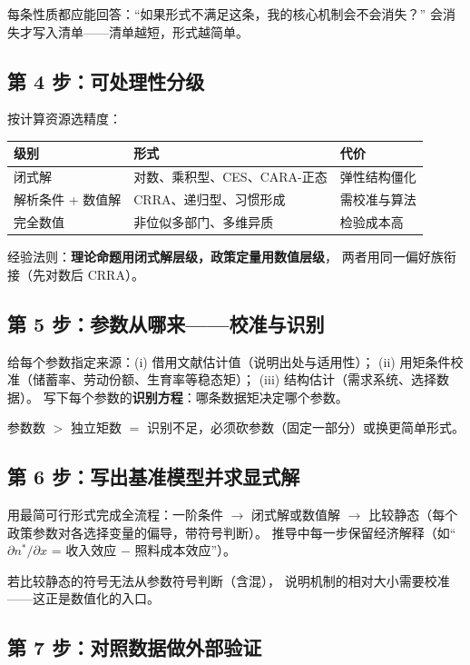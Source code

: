 每条性质都应能回答：“如果形式不满足这条，我的核心机制会不会消失？”
会消失才写入清单——清单越短，形式越简单。

\subsection{第 4 步：可处理性分级}

按计算资源选精度：
\begin{center}
\small
\setlength{\tabcolsep}{4pt}
\begin{tabular}{lll}
\toprule
级别 & 形式 & 代价 \\
\midrule
闭式解 & 对数、乘积型、CES、CARA-正态 & 弹性结构僵化 \\
解析条件 + 数值解 & CRRA、递归型、习惯形成 & 需校准与算法 \\
完全数值 & 非位似多部门、多维异质 & 检验成本高 \\
\bottomrule
\end{tabular}
\end{center}
经验法则：\textbf{理论命题用闭式解层级，政策定量用数值层级}，
两者用同一偏好族衔接（先对数后 CRRA）。

\subsection{第 5 步：参数从哪来——校准与识别}

给每个参数指定来源：(i) 借用文献估计值（说明出处与适用性）；
(ii) 用矩条件校准（储蓄率、劳动份额、生育率等稳态矩）；
(iii) 结构估计（需求系统、选择数据）。
写下每个参数的\textbf{识别方程}：哪条数据矩决定哪个参数。

参数数 $>$ 独立矩数 $=$ 识别不足，必须砍参数（固定一部分）或换更简单形式。

\subsection{第 6 步：写出基准模型并求显式解}

用最简可行形式完成全流程：一阶条件 $\to$ 闭式解或数值解
$\to$ 比较静态（每个政策参数对各选择变量的偏导，带符号判断）。
推导中每一步保留经济解释（如“$\partial n^*/\partial x$ = 收入效应 $-$ 照料成本效应”）。

若比较静态的符号无法从参数符号判断（含混），
说明机制的相对大小需要校准——这正是数值化的入口。

\subsection{第 7 步：对照数据做外部验证}

